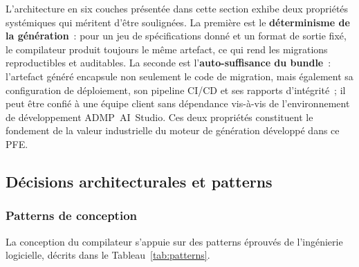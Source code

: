 L'architecture en six couches présentée dans cette section exhibe deux propriétés systémiques qui méritent d'être soulignées. La première est le \textbf{déterminisme de la génération}~: pour un jeu de spécifications donné et un format de sortie fixé, le compilateur produit toujours le même artefact, ce qui rend les migrations reproductibles et auditables. La seconde est l'\textbf{auto-suffisance du bundle}~: l'artefact généré encapsule non seulement le code de migration, mais également sa configuration de déploiement, son pipeline CI/CD et ses rapports d'intégrité~; il peut être confié à une équipe client sans dépendance vis-à-vis de l'environnement de développement ADMP~AI~Studio. Ces deux propriétés constituent le fondement de la valeur industrielle du moteur de génération développé dans ce PFE.

\subsection{Décisions architecturales et patterns}
\label{subsec:decisions-archi}

\subsubsection*{Patterns de conception}

La conception du compilateur s'appuie sur des patterns éprouvés de l'ingénierie logicielle, décrits dans le Tableau~\ref{tab:patterns}.

